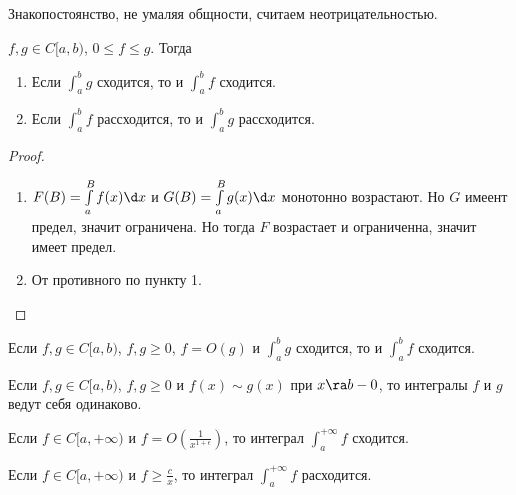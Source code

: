 Знакопостоянство, не умаляя общности, считаем неотрицательностью.

\begin{theorem}
	$f, g \in C[a,b)$, $0 \le f \le g$.
	Тогда
	\begin{enumerate}
		\item Если $\int_a^b g$ сходится, то и $\int_a^b f$ сходится.
		\item Если $\int_a^b f$ рассходится, то и $\int_a^b g$ рассходится.
	\end{enumerate}
\end{theorem}
\begin{proof}\begin{enumerate}
\item
	$F(B) = \int\limits_a^B f(x) \d x$ и $G(B) = \int\limits_a^B g(x) \d x$ монотонно возрастают.
	Но $G$ имеент предел, значит ограничена.
	Но тогда $F$ возрастает и ограниченна, значит имеет предел.

\item
	От противного по пункту 1.
\end{enumerate}\end{proof}

\begin{conseq}
	Если $f, g \in C[a, b)$, $f, g \ge 0$, $f = O(g)$ и $\int_a^b g$ сходится, то и $\int_a^b f$ сходится.
\end{conseq}

\begin{conseq}
	Если $f, g \in C[a, b)$, $f, g \ge 0$ и $f(x) \sim g(x)$ при $x \ra b-0$, то интегралы $f$ и $g$ ведут себя одинаково.
\end{conseq}

\begin{conseq}
	Если $f \in C[a, +\infty)$ и $f = O\left(\frac1{x^{1+\epsilon}}\right)$, то интеграл $\int_a^{+\infty} f$ сходится.
\end{conseq}

\begin{conseq}
	Если $f \in C[a, +\infty)$ и $f \ge \frac{c}x$, то интеграл $\int_a^{+\infty} f$ расходится.
\end{conseq}

